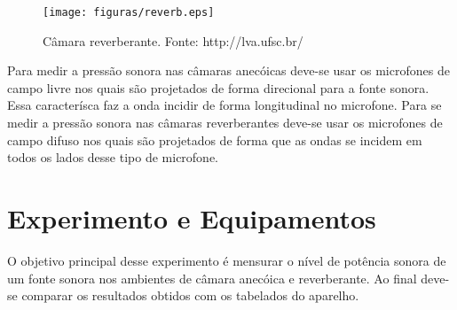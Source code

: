 \begin{figure}[h!]
    \centering
    \texttt{[image: figuras/reverb.eps]}
    \caption{Câmara reverberante. Fonte: http://lva.ufsc.br/}
    \label{figura_2}
\end{figure}

Para medir a pressão sonora nas câmaras anecóicas deve-se usar os microfones de campo livre nos quais são projetados de forma direcional para a fonte sonora. Essa caracterísca faz a onda incidir de forma longitudinal no microfone. Para se medir a pressão sonora nas câmaras reverberantes deve-se usar os microfones de campo difuso nos quais são projetados de forma que as ondas se incidem em todos os lados desse tipo de microfone.


\chapter{Experimento e Equipamentos}\label{descricao}

O objetivo principal desse experimento é mensurar o nível de potência sonora de um fonte sonora nos ambientes de câmara anecóica e reverberante. Ao final deve-se comparar os resultados obtidos com os tabelados do aparelho.

